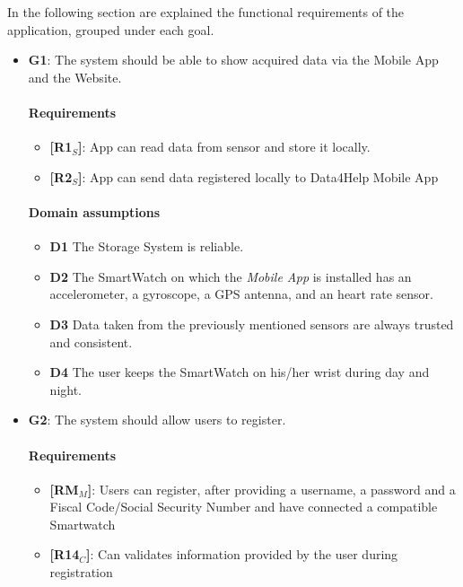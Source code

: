 In the following section are explained the functional requirements of the application, grouped under each goal.

\begin{itemize}
    \item \textbf{G1}: The system should be able to show acquired data via the Mobile App and the Website.
    \paragraph{Requirements}
   \begin{itemize}
    \item \textbf{[R1$_S$]}: App can read data from sensor and store it locally.
    \item \textbf{[R2$_S$]}: App can send data registered locally to Data4Help Mobile App
   \end{itemize}
   \paragraph{Domain assumptions}
   \begin{itemize}
    \item  \textbf{D1}  The Storage System is reliable.
    
    \item  \textbf{D2}  The SmartWatch on which the \textit{Mobile App} is installed has an accelerometer, a gyroscope, a GPS antenna, and an heart rate sensor.
    
    \item  \textbf{D3}  Data taken from the previously mentioned sensors are always trusted and consistent.
            
    \item  \textbf{D4}  The user keeps the SmartWatch on his/her wrist during day and night.
   \end{itemize}
   
    \item \textbf{G2}: The system should allow users to register.
    \paragraph{Requirements}
   \begin{itemize}
    \item \textbf{[RM$_M$]}: Users can register, after providing a username, a password and a Fiscal Code/Social Security Number and have connected a compatible Smartwatch
    \item \textbf{[R14$_C$]}: Can validates information provided by the user during registration
   \end{itemize}

\end{itemize}
